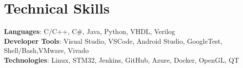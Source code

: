 \documentclass[letterpaper,12pt]{article}
\newcommand{\resumeSubHeadingListStart}{\begin{itemize}[leftmargin=0.0in, label={}]}
\newcommand{\resumeSubHeadingListEnd}{\end{itemize}}
\begin{document}
 

\section{\color{blue_head}Technical Skills}
 \begin{itemize}[leftmargin=0.15in, label={}]
    \small{\item{
     \textbf{Languages}{: C/C++, C\#, Java, Python, VHDL, Verilog} \\
     \textbf{Developer Tools}{: Visual Studio, VSCode, Android Studio, GoogleTest, Shell/Bash,VMware, Vivado} \\
     \textbf{Technologies}{: Linux, STM32, Jenkins, GitHub, Azure, Docker, OpenGL, QT} \\
    }}
 \end{itemize}
\vspace{-20pt}

\end{document}
